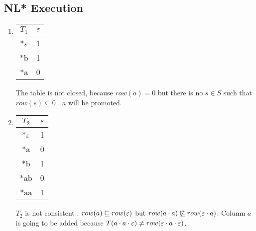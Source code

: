 \subsection{NL* Execution}
\begin{enumerate}
  \item \begin{minipage}{0.3\textwidth}
          \begin{tabular}{c||c}
            $T_1$              & $\varepsilon$ \\
            \hline\hline
            *$\varepsilon$\footnotemark & 1    \\
            \hline\hline
            *b                 & 1    \\
            *a                 & 0    \\
          \end{tabular}
        \end{minipage}  \quad
        \begin{minipage}{0.6\textwidth}
          The table is not closed, because $row(a) = 0$ but there is no $s \in S$ such that $row(s) \subseteq 0$ . $a$ will be promoted.
        \end{minipage}

  \item \begin{minipage}{0.3\textwidth}
          \begin{tabular}{c||c}
            $T_2$ & $\varepsilon$ \\
            \hline\hline
            *$\varepsilon$ & 1    \\
            *a    & 0    \\
            \hline\hline
            *b    & 1    \\
            *ab   & 0    \\
            *aa   & 1    \\
          \end{tabular}
        \end{minipage}\quad
        \begin{minipage}{0.6\textwidth}
          $T_2$ is not consistent : $row(a) \sqsubseteq row(\varepsilon)$ but $row(a \cdot a) \not\sqsubseteq row(\varepsilon \cdot a)$. Column $a$ is going to be added because $T(a \cdot a \cdot \varepsilon) \neq row(\varepsilon \cdot a \cdot \varepsilon)$.
        \end{minipage}


\end{enumerate}
